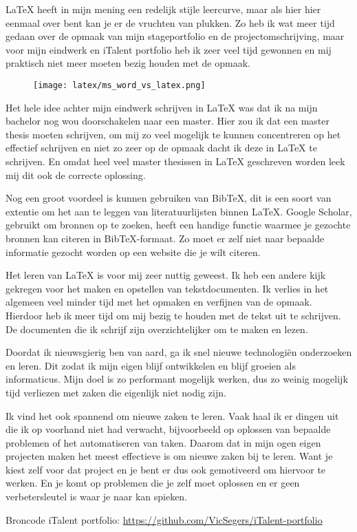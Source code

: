 \LaTeX{} heeft in mijn mening een redelijk stijle leercurve, maar als hier hier eenmaal over bent kan je er de vruchten van plukken. Zo heb ik wat meer tijd gedaan over de opmaak van mijn stageportfolio en de projectomschrijving, maar voor mijn eindwerk en iTalent portfolio heb ik zeer veel tijd gewonnen en mij praktisch niet meer moeten bezig houden met de opmaak.

\begin{figure}[!h]
    \centering
    \texttt{[image: latex/ms\_word\_vs\_latex.png]}
  \end{figure}

Het hele idee achter mijn eindwerk schrijven in \LaTeX{} was dat ik na mijn bachelor nog wou doorschakelen naar een master. Hier zou ik dat een master thesis moeten schrijven, om mij zo veel mogelijk te kunnen concentreren op het effectief schrijven en niet zo zeer op de opmaak dacht ik deze in \LaTeX{} te schrijven. En omdat heel veel master thesissen in \LaTeX{} geschreven worden leek mij dit ook de correcte oplossing.

Nog een groot voordeel is kunnen gebruiken van Bib\TeX{}, dit is een soort van extentie om het aan te leggen van literatuurlijsten binnen \LaTeX. Google Scholar, gebruikt om bronnen op te zoeken, heeft een handige functie waarmee je gezochte bronnen kan citeren in Bib\TeX\hyp{}formaat. Zo moet er zelf niet naar bepaalde informatie gezocht worden op een website die je wilt citeren.

Het leren van \LaTeX{} is voor mij zeer nuttig geweest. Ik heb een andere kijk gekregen voor het maken en opstellen van tekstdocumenten. Ik verlies in het algemeen veel minder tijd met het opmaken en verfijnen van de opmaak. Hierdoor heb ik meer tijd om mij bezig te houden met de tekst uit te schrijven. De documenten die ik schrijf zijn overzichtelijker om te maken en lezen.

Doordat ik nieuwsgierig ben van aard, ga ik snel nieuwe technologi\"en onderzoeken en leren. Dit zodat ik mijn eigen blijf ontwikkelen en blijf groeien als informaticus. Mijn doel is zo performant mogelijk werken, dus zo weinig mogelijk tijd verliezen met zaken die eigenlijk niet nodig zijn.

Ik vind het ook spannend om nieuwe zaken te leren. Vaak haal ik er dingen uit die ik op voorhand niet had verwacht, bijvoorbeeld op oplossen van bepaalde problemen of het automatiseren van taken. Daarom dat in mijn ogen eigen projecten maken het meest effectieve is om nieuwe zaken bij te leren. Want je kiest zelf voor dat project en je bent er dus ook gemotiveerd om hiervoor te werken. En je komt op problemen die je zelf moet oplossen en er geen verbetersleutel is waar je naar kan spieken.

Broncode iTalent portfolio: \url{https://github.com/VicSegers/iTalent-portfolio}